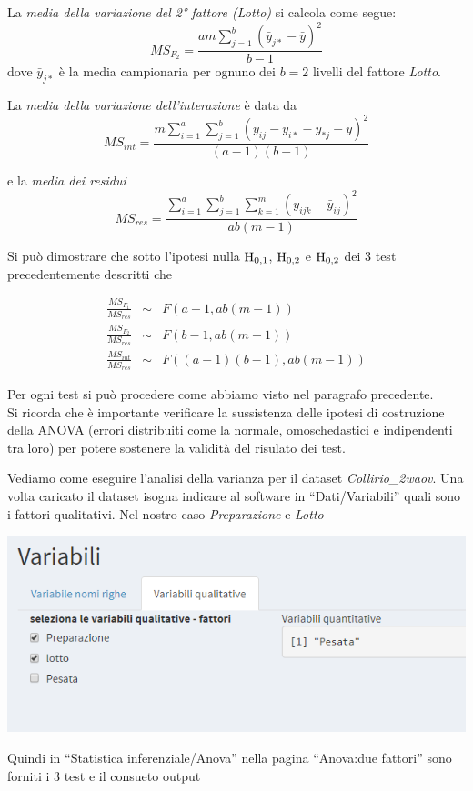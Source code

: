 \documentclass[
  11pt,
]{book}
\begin{document}
La \emph{media della variazione del 2° fattore (Lotto)} si calcola come segue:
\[
MS_{F_2}=\frac{am\sum_{j=1}^b(\bar{y}_{j*} -\bar{y})^2}{b-1}
\]
dove \(\bar{y}_{j*}\) è la media campionaria per ognuno dei \(b=2\) livelli del fattore \emph{Lotto}.

La \emph{media della variazione dell'interazione} è data da
\[
MS_{{int}}=\frac{m\sum_{i=1}^a\sum_{j=1}^b(\bar{y}_{ij}-\bar{y}_{i*}-\bar{y}_{*j} -\bar{y})^2}{(a-1)(b-1)}
\]

e la \emph{media dei residui}
\[
MS_{{res}}=\frac{\sum_{i=1}^a\sum_{j=1}^b\sum_{k=1}^m(y_{ijk}-\bar{y}_{ij})^2}{ab(m-1)}
\]

Si può dimostrare che sotto l'ipotesi nulla \(\rm{H_{0,1}}\), \(\rm{H_{0,2}}\) e \(\rm{H_{0,2}}\) dei 3 test precedentemente descritti che

\begin{eqnarray*}
\frac{MS_{F_1}}{MS_{{res}}}&\sim&F(a-1,ab(m-1))\\
\frac{MS_{F_2}}{MS_{{res}}}&\sim&F(b-1,ab(m-1))\\
\frac{MS_{{int}}}{MS_{{res}}}&\sim&F((a-1)(b-1),ab(m-1))
\end{eqnarray*}

Per ogni test si può procedere come abbiamo visto nel paragrafo precedente.\\
Si ricorda che è importante verificare la sussistenza delle ipotesi di costruzione della ANOVA (errori distribuiti come la normale, omoschedastici e indipendenti tra loro) per potere sostenere la validità del risulato dei test.

Vediamo come eseguire l'analisi della varianza per il dataset \emph{Collirio\_2waov}. Una volta caricato il dataset isogna indicare al software in ``Dati/Variabili'' quali sono i fattori qualitativi. Nel nostro caso \emph{Preparazione} e \emph{Lotto}

\begin{center}\includegraphics[width=0.5\linewidth]{Immagini/Anova/12_variab_quali} \end{center}

Quindi in ``Statistica inferenziale/Anova'' nella pagina ``Anova:due fattori'' sono forniti i 3 test e il consueto output
\end{document}

